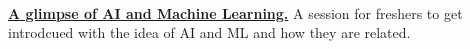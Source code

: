 \\
\vspace{\topsep}
\begin{tightitemize}
	\item \href{https://github.com/mehedi-shafi/ai-ml-talk}{\bf A glimpse of AI and Machine Learning.}
{\small A session for freshers to get introdcued with the idea of AI and ML and how they are related.}
\end{tightitemize}

\sectionspace
